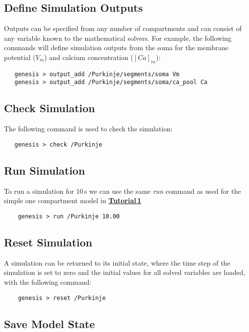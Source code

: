 \documentclass[12pt]{article}
\begin{document}
\subsection*{Define Simulation Outputs}

Outputs can be specified from any number of compartments and can consist of any variable known to the mathematical solvers. For example, the following commands will define simulation outputs from the soma for the membrane potential ($V_m$) and calcium concentration ($[Ca]_{in}$):
\begin{verbatim}
   genesis > output_add /Purkinje/segments/soma Vm
   genesis > output_add /Purkinje/segments/soma/ca_pool Ca
\end{verbatim}

\subsection*{Check Simulation}

The following command is used to check the simulation:
\begin{verbatim}
   genesis > check /Purkinje
\end{verbatim}

\subsection*{Run Simulation}

To run a simulation for 10\,s we can use the same {\it run} command as used for the simple one compartment model in \href{../tutorial1/tutorial1.tex}{\bf Tutorial\,1}
\begin{verbatim}
    genesis > run /Purkinje 10.00
\end{verbatim}

\subsection*{Reset Simulation}

A simulation can be returned to its initial state, where the time step of the simulation is set to zero and the initial values for all solved variables are loaded, with the following command:
\begin{verbatim}
    genesis > reset /Purkinje
\end{verbatim}

\subsection*{Save Model State}
\end{document}
